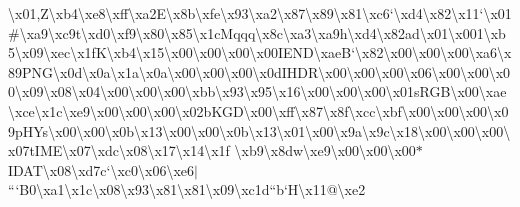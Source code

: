 \textbackslash{}x01,\+Z\textbackslash{}xb4\textbackslash{}xe8\textbackslash{}xff\textbackslash{}xa2\+E\textbackslash{}x8b\textbackslash{}xfe\textbackslash{}x93\textbackslash{}xa2\textbackslash{}x87\textbackslash{}x89\textbackslash{}x81\textbackslash{}xc6`\textbackslash{}xd4\textbackslash{}x82\textbackslash{}x11`\textbackslash{}x01\#\textbackslash{}xa9\textbackslash{}xc9t\textbackslash{}xd0\textbackslash{}xf9\textbackslash{}x80\textbackslash{}x85\textbackslash{}x1c\+Mqqq\textbackslash{}x8c\textbackslash{}xa3\textbackslash{}xa9h\textbackslash{}xd4\textbackslash{}x82ad\textbackslash{}x01\textbackslash{}x001\textbackslash{}xb5\textbackslash{}x09\textbackslash{}xec\textbackslash{}x1f\+K\textbackslash{}xb4\textbackslash{}x15\textbackslash{}x00\textbackslash{}x00\textbackslash{}x00\textbackslash{}x00\+I\+E\+N\+D\textbackslash{}xae\+B`\textbackslash{}x82\textbackslash{}x00\textbackslash{}x00\textbackslash{}x00\textbackslash{}xa6\textbackslash{}x89\+P\+N\+G\textbackslash{}x0d\textbackslash{}x0a\textbackslash{}x1a\textbackslash{}x0a\textbackslash{}x00\textbackslash{}x00\textbackslash{}x00\textbackslash{}x0d\+I\+H\+D\+R\textbackslash{}x00\textbackslash{}x00\textbackslash{}x00\textbackslash{}x06\textbackslash{}x00\textbackslash{}x00\textbackslash{}x00\textbackslash{}x09\textbackslash{}x08\textbackslash{}x04\textbackslash{}x00\textbackslash{}x00\textbackslash{}x00\textbackslash{}xbb\textbackslash{}x93\textbackslash{}x95\textbackslash{}x16\textbackslash{}x00\textbackslash{}x00\textbackslash{}x00\textbackslash{}x01s\+R\+G\+B\textbackslash{}x00\textbackslash{}xae\textbackslash{}xce\textbackslash{}x1c\textbackslash{}xe9\textbackslash{}x00\textbackslash{}x00\textbackslash{}x00\textbackslash{}x02b\+K\+G\+D\textbackslash{}x00\textbackslash{}xff\textbackslash{}x87\textbackslash{}x8f\textbackslash{}xcc\textbackslash{}xbf\textbackslash{}x00\textbackslash{}x00\textbackslash{}x00\textbackslash{}x09p\+H\+Ys\textbackslash{}x00\textbackslash{}x00\textbackslash{}x0b\textbackslash{}x13\textbackslash{}x00\textbackslash{}x00\textbackslash{}x0b\textbackslash{}x13\textbackslash{}x01\textbackslash{}x00\textbackslash{}x9a\textbackslash{}x9c\textbackslash{}x18\textbackslash{}x00\textbackslash{}x00\textbackslash{}x00\textbackslash{}x07t\+I\+M\+E\textbackslash{}x07\textbackslash{}xdc\textbackslash{}x08\textbackslash{}x17\textbackslash{}x14\textbackslash{}x1f \textbackslash{}xb9\textbackslash{}x8dw\textbackslash{}xe9\textbackslash{}x00\textbackslash{}x00\textbackslash{}x00$\ast$\+I\+D\+A\+T\textbackslash{}x08\textbackslash{}xd7c`\textbackslash{}xc0\textbackslash{}x06\textbackslash{}xe6$\vert$```\+B0\textbackslash{}xa1\textbackslash{}x1c\textbackslash{}x08\textbackslash{}x93\textbackslash{}x81\textbackslash{}x81\textbackslash{}x09\textbackslash{}xc1d``b`\+H\textbackslash{}x11@\textbackslash{}xe2 